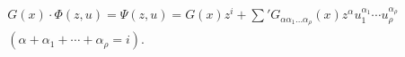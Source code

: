 
\[
\begin{gathered}
G(x)\cdot\Phi(z,u)=\Psi(z,u)=G(x)z^i+\sum{}'G_{\alpha\alpha_1\ldots\alpha_\rho}(x)z^\alpha u_1^{\alpha_1}\cdots u_\rho^{\alpha_\rho}\\
(\alpha+\alpha_1+\cdots+\alpha_\rho=i).
\end{gathered}
\]
